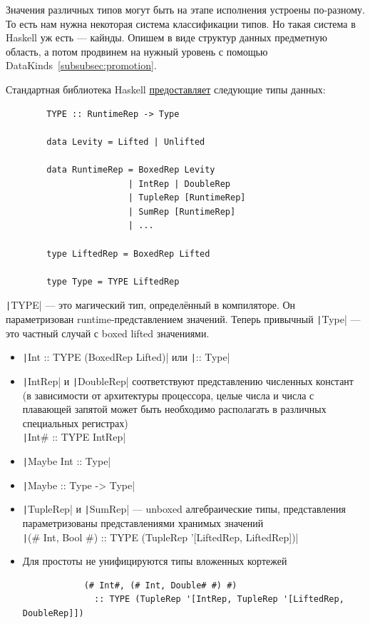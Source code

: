 \documentclass[12pt]{article}
\begin{document}
    Значения различных типов могут быть на этапе исполнения устроены по-разному.
    То есть нам нужна некоторая система классификации типов.
    Но такая система в Haskell уж есть --- кайнды.
    Опишем в виде структур данных предметную область, а потом продвинем на нужный уровень с помощью DataKinds~\ref{subsubsec:promotion}.

    Стандартная библиотека Haskell \href{https://downloads.haskell.org/ghc/latest/docs/users_guide/exts/representation_polymorphism.html}{предоставляет} следующие типы данных:
    \begin{verbatim}
        TYPE :: RuntimeRep -> Type

        data Levity = Lifted | Unlifted

        data RuntimeRep = BoxedRep Levity
                        | IntRep | DoubleRep
                        | TupleRep [RuntimeRep]
                        | SumRep [RuntimeRep]
                        | ...

        type LiftedRep = BoxedRep Lifted

        type Type = TYPE LiftedRep
    \end{verbatim}
    \texttt|TYPE| --- это магический тип, определённый в компиляторе.
    Он параметризован runtime-представлением значений.
    Теперь привычный \texttt|Type| --- это частный случай с boxed lifted значениями.

    \begin{itemize}
        \item \texttt|Int :: TYPE (BoxedRep Lifted)| или \texttt|:: Type|
        \item \texttt|IntRep| и \texttt|DoubleRep| соответствуют представлению численных констант (в зависимости от архитектуры процессора, целые числа и числа с плавающей запятой может быть необходимо располагать в различных специальных регистрах)\\ \texttt|Int# :: TYPE IntRep|
        \item \texttt|Maybe Int :: Type|
        \item \texttt|Maybe :: Type -> Type|
        \item \texttt|TupleRep| и \texttt|SumRep| --- unboxed алгебраические типы, представления параметризованы представлениями хранимых значений\\
        \texttt|(# Int, Bool #) :: TYPE (TupleRep '[LiftedRep, LiftedRep])|
        \item Для простоты не унифицируются типы вложенных кортежей
        \begin{verbatim}
            (# Int#, (# Int, Double# #) #)
              :: TYPE (TupleRep '[IntRep, TupleRep '[LiftedRep, DoubleRep]])
        \end{verbatim}
    \end{itemize}
\end{document}
